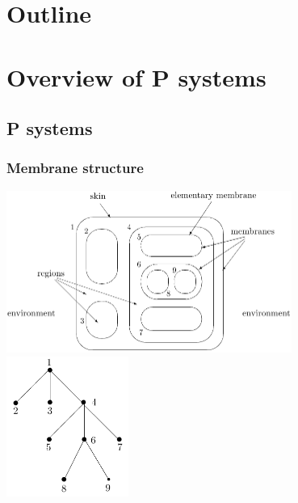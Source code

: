 \section*{Outline}
\begin{frame}
\tableofcontents
\end{frame}
\note{}

\section{Overview of P systems} %
\label{sec:overview_of_p_systems}

  \subsection{P systems} %
  \label{sub:p_systems}

    \begin{frame}[t]\frametitle{Membrane structure}
      \includegraphics[width=0.7\textwidth]{membrane_structure.png}
      \hfill
      \includegraphics[width=0.3\textwidth]{membrane_tree.png}

    \end{frame}
    \note{}



